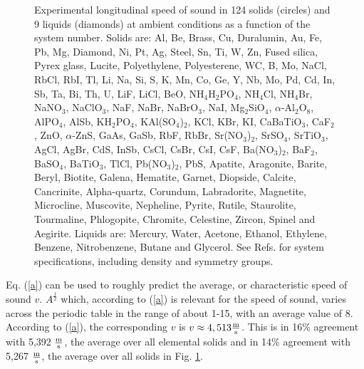 \documentclass[aps,prl,groupedaddress,fleqn,twocolumn,10pt]{revtex4}
\begin{document}
\begin{figure}
{}
\caption{Experimental longitudinal speed of sound \cite{handbook,handbook1,handbook2} in 124 solids (circles) and 9 liquids \cite{handbook} (diamonds) at ambient conditions as a function of the system number. Solids are: Al, Be, Brass, Cu, Duralumin, Au, Fe, Pb, Mg, Diamond, Ni, Pt, Ag, Steel, Sn, Ti, W, Zn, Fused silica, Pyrex glass, Lucite, Polyethylene, Polyesterene, WC, B, Mo, NaCl, RbCl, RbI, Tl, Li, Na, Si, S, K, Mn, Co, Ge, Y, Nb, Mo, Pd, Cd, In, Sb, Ta, Bi, Th, U, LiF, LiCl, BeO, NH$_4$H$_2$PO$_4$, NH$_4$Cl, NH$_4$Br, NaNO$_3$, NaClO$_3$, NaF, NaBr, NaBrO$_3$, NaI, Mg$_2$SiO$_4$, $\alpha$-Al$_2$O$_8$, AlPO$_4$, AlSb, KH$_2$PO$_4$, KAl(SO$_4$)$_2$, KCl, KBr, KI, CaBaTiO$_3$, CaF$_2$, ZnO, $\alpha$-ZnS, GaAs, GaSb, RbF, RbBr, Sr(NO$_3$)$_2$, SrSO$_4$, SrTiO$_3$, AgCl, AgBr, CdS, InSb, CsCl, CsBr, CsI, CsF, Ba(NO$_3$)$_2$, BaF$_2$, BaSO$_4$, BaTiO$_3$, TlCl, Pb(NO$_3$)$_2$, PbS, Apatite, Aragonite, Barite, Beryl, Biotite, Galena, Hematite, Garnet, Diopside, Calcite, Cancrinite, Alpha-quartz, Corundum, Labradorite, Magnetite, Microcline, Muscovite, Nepheline, Pyrite, Rutile, Staurolite, Tourmaline, Phlogopite, Chromite, Celestine, Zircon, Spinel and Aegirite. Liquids are: Mercury, Water, Acetone, Ethanol, Ethylene, Benzene, Nitrobenzene, Butane and Glycerol. See Refs. \cite{handbook,handbook1,handbook2} for system specifications, including density and symmetry groups.
}
\label{all}
\end{figure}

Eq. (\ref{a}) can be used to roughly predict the average, or characteristic speed of sound $v$. $A^{\frac{1}{2}}$ which, according to (\ref{a}) is relevant for the speed of sound, varies across the periodic table in the range of about 1-15, with an average value of 8. According to (\ref{a}), the corresponding $v$ is $v\approx 4,513\frac{\rm m}{\rm s}$. This is in 16\% agreement with 5,392 $\frac{\rm m}{\rm s}$, the average over all elemental solids and in 14\% agreement with 5,267 $\frac{\rm m}{\rm s}$, the average over all solids in Fig. \ref{all}.
\end{document}
